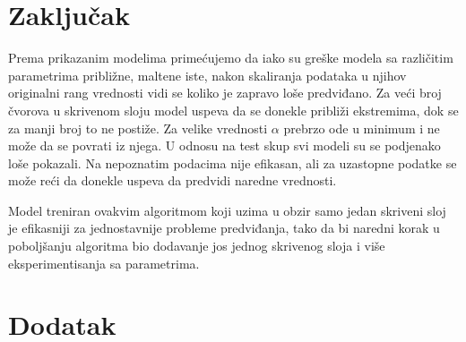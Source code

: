\documentclass[a4paper]{article}
\begin{document}
\pagebreak

\restoregeometry
\section{Zaključak}

Prema prikazanim modelima primećujemo da iako su greške modela sa različitim parametrima približne, maltene iste, nakon skaliranja podataka u njihov originalni rang vrednosti vidi se koliko je zapravo loše predviđano. 
Za veći broj čvorova u skrivenom sloju model uspeva da se donekle približi ekstremima, dok se za manji broj to ne postiže. Za velike vrednosti $\alpha$ prebrzo ode u minimum i ne može da se povrati iz njega. U odnosu na test skup svi modeli su se podjenako loše pokazali. Na nepoznatim podacima nije efikasan, ali za uzastopne podatke se može reći da donekle uspeva da predvidi naredne vrednosti.

Model treniran ovakvim algoritmom koji uzima u obzir samo jedan skriveni sloj je efikasniji za jednostavnije probleme predviđanja, tako da bi naredni korak u poboljšanju algoritma bio dodavanje jos jednog skrivenog sloja i više eksperimentisanja sa parametrima.

\appendix
 


\appendix
\section{Dodatak}
\end{document}
